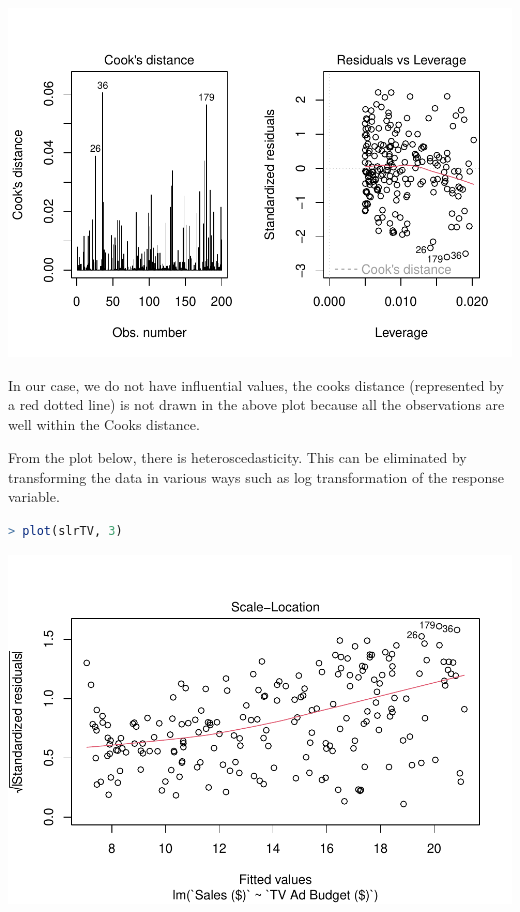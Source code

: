 \documentclass[
]{article}
\begin{document}
\includegraphics{Types-of-Regressions_files/figure-latex/unnamed-chunk-18-1.pdf}

In our case, we do not have influential values, the cooks distance
(represented by a red dotted line) is not drawn in the above plot
because all the observations are well within the Cooks distance.

From the plot below, there is heteroscedasticity. This can be eliminated
by transforming the data in various ways such as log transformation of
the response variable.

\begin{lstlisting}[language=R]
> plot(slrTV, 3)
\end{lstlisting}

\includegraphics{Types-of-Regressions_files/figure-latex/unnamed-chunk-19-1.pdf}
\end{document}
